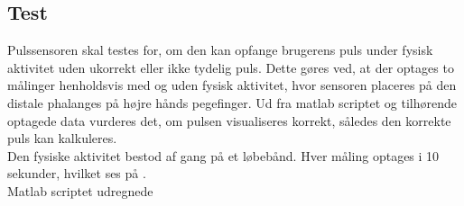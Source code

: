 \subsection{Test}
Pulssensoren skal testes for, om den kan opfange brugerens puls under fysisk aktivitet uden ukorrekt eller ikke tydelig puls. Dette gøres ved, at der optages to målinger henholdsvis med og uden fysisk aktivitet, hvor sensoren placeres på den distale phalanges på højre hånds pegefinger. Ud fra matlab scriptet og tilhørende optagede data vurderes det, om pulsen visualiseres korrekt, således den korrekte puls kan kalkuleres.\\
Den fysiske aktivitet bestod af gang på et løbebånd. Hver måling optages i 10 sekunder, hvilket ses på .\\
Matlab scriptet udregnede



